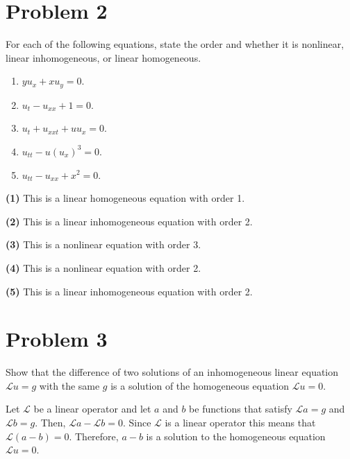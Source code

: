 \documentclass{ben}
\begin{document}
    \section{Problem 2}
    For each of the following equations, state the order and whether it is
    nonlinear, linear inhomogeneous, or linear homogeneous.
    \begin{enumerate}[label=(\textbf{\arabic*)}]
        \item $y u_x + x u_y = 0$.
        \item $u_t - u_{xx} + 1 = 0$.
        \item $u_t + u_{xxt} + u u_x = 0$.
        \item $u_{tt} - u(u_x)^3 = 0$.
        \item $u_{tt} - u_{xx} + x^2 = 0$.
    \end{enumerate}
    \begin{multipart}
        \item [\textbf{(1)}] This is a linear homogeneous equation with order 1.
        \item [\textbf{(2)}] This is a linear inhomogeneous equation with order 2.
        \item [\textbf{(3)}] This is a nonlinear equation with order 3.
        \item [\textbf{(4)}] This is a nonlinear equation with order 2.
        \item [\textbf{(5)}] This is a linear inhomogeneous equation with order 2.
    \end{multipart}
    \section{Problem 3}
    Show that the difference of two solutions of an inhomogeneous linear equation
    $\mathscr{L}u = g$ with the same $g$ is a solution of the homogeneous equation
    $\mathscr{L}u = 0$.
    \begin{solution}
        Let $\mathscr{L}$ be a linear operator and let $a$ and $b$ be functions that satisfy
        $\mathscr{L}a = g$ and $\mathscr{L}b = g$. Then, $\mathscr{L}a - \mathscr{L}b = 0$.
        Since $\mathscr{L}$ is a linear operator this means that $\mathscr{L}(a - b) = 0$.
        Therefore, $a - b$ is a solution to the homogeneous equation $\mathscr{L}u = 0$.
    \end{solution}
\end{document}
